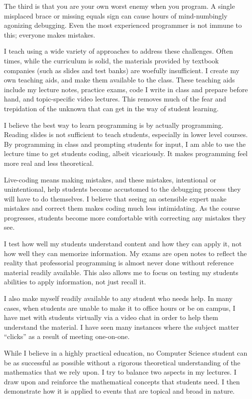 \documentclass[12pt,a4paper]{article}
\begin{document}
The third is that you are your own worst enemy when you program.
A single misplaced brace or missing equals sign can cause hours of mind-numbingly agonizing debugging.
Even the most experienced programmer is not immune to this; everyone makes mistakes.

I teach using a wide variety of approaches to address these challenges.
Often times, while the curriculum is solid, the materials provided by textbook companies (such as slides and test banks) are woefully insufficient.
I create my own teaching aids, and make them available to the class.
These teaching aids include my lecture notes, practice exams, code I write in class and prepare before hand, and topic-specific video lectures.
This removes much of the fear and trepidation of the unknown that can get in the way of student learning.

I believe the best way to learn programming is by actually programming.
Reading slides is not sufficient to teach students, especially in lower level courses.
By programming in class and prompting students for input, I am able to use the lecture time to get students coding, albeit vicariously.
It makes programming feel more real and less theoretical.

Live-coding means making mistakes, and these mistakes, intentional or unintentional, help students become accustomed to the debugging process they will have to do themselves.
I believe that seeing an ostensible expert make mistakes and correct them makes coding much less intimidating.
As the course progresses, students become more comfortable with correcting any mistakes they see.


I test how well my students understand content and how they can apply it, not how well they can memorize information.
My exams are open notes to reflect the reality that professorial programming is almost never done without reference material readily available.
This also allows me to focus on testing my students abilities to apply information, not just recall it.

I also make myself readily available to any student who needs help.
In many cases, when students are unable to make it to office hours or be on campus, I have met with students virtually via a video chat in order to help them understand the material.
I have seen many instances where the subject matter ``clicks'' as a result of meeting one-on-one.



While I believe in a highly practical education, no Computer Science student can be as successful as possible without a rigorous theoretical understanding of the mathematics that we rely upon.
I try to balance two aspects in my lectures.
I draw upon and reinforce the mathematical concepts that students need. 
I then demonstrate how it is applied to events that are topical and broad in nature.
\end{document}
